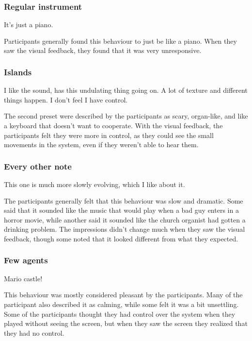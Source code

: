 \documentclass[a4paper,english]{report}
\begin{document}
	\subsubsection{Regular instrument}
	\begin{displayquote}
		It's just a piano.
	\end{displayquote}
	Participants generally found this behaviour to just be like a piano. When they saw the visual feedback, they found that it was very unresponsive.
	\subsubsection{Islands}
	\begin{displayquote}
		I like the sound, has this undulating thing going on. A lot of texture and different things happen. I don't feel I have control.
	\end{displayquote}
	The second preset were described by the participants as scary, organ-like, and like a keyboard that doesn't want to cooperate. With the visual feedback, the participants felt they were more in control, as they could see the small movements in the system, even if they weren't able to hear them.
	\subsubsection{Every other note}
	\begin{displayquote}
		This one is much more slowly evolving, which I like about it.
	\end{displayquote}
	The participants generally felt that this behaviour was slow and dramatic. Some said that it sounded like the music that would play when a bad guy enters in a horror movie, while another said it sounded like the church organist had gotten a drinking problem. The impressions didn't change much when they saw the visual feedback, though some noted that it looked different from what they expected.
	\subsubsection{Few agents}
	\begin{displayquote}
		Mario castle!
	\end{displayquote}
	This behaviour was mostly considered pleasant by the participants. Many of the participant also described it as calming, while some felt it was a bit unsettling. Some of the participants thought they had control over the system when they played without seeing the screen, but when they saw the screen they realized that they had no control.
\end{document}
